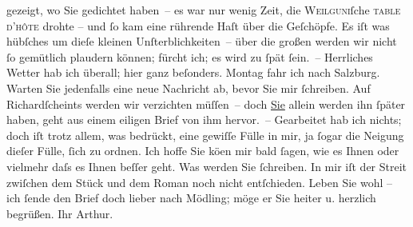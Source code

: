 \begin{ledgroupsized}[t]{13cm}
               gezeigt, wo Sie gedichtet haben – es war nur wenig Zeit, die \textsc{Weil{\pb}guni}ſche \textsc{table d’hôte} drohte – und ſo kam eine rührende
               Haſt über die Geſchöpfe. Es iſt was hübſches um dieſe kleinen Unſterblichkeiten –
               über die großen werden wir nicht ſo gemütlich plaudern können; fürcht ich; es wird zu
               ſpät ſein. –\pend
           \pstart
           Herrliches Wetter hab ich überall; hier ganz beſonders. Montag fahr ich
               nach Salzburg. Warten Sie {\pb}jedenfalls eine neue Nachricht ab, bevor Sie mir
               ſchreiben. Auf Richardſcheints werden wir verzichten müſſen – doch \uline{Sie}{ }\introOben{}allein\introOben{} werden ihn ſpäter haben, geht aus einem eiligen Brief
               von ihm hervor. –\pend
           \pstart
           Gearbeitet hab ich nichts; doch iſt trotz allem, was bedrückt, eine gewiſſe Fülle in
               mir, ja ſogar die Neigung dieſer Fülle, ſich zu {\pb}ordnen.\pend
           \pstart
           Ich hoffe Sie kö{\geminationn}en mir bald ſagen, wie es Ihnen \introOben{}oder vielmehr\introOben{} daſs es Ihnen beſſer geht. Was werden Sie
               ſchreiben. In mir iſt der Streit zwiſchen dem Stück und dem Roman noch nicht entſchieden.\pend
           \pstart
           Leben Sie wohl – ich ſende den Brief doch lieber nach Mödling; möge er Sie heiter u. herzlich begrüßen.\pend
           \pstart Ihr \spacefill\mbox{Arthur.}\pend{}
         
         \endnumbering{}\end{ledgroupsized}  \newcommand{\dateiname}{L00826}\newcommand{\titel}{Arthur Schnitzler an Hugo von Hofmannsthal, 23. 7. 1898}\newcommand{\editorInnen}{Martin Anton Müller und Gerd-Hermann Susen}
      